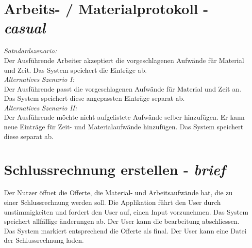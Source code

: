 \documentclass[journal]{combine}
\begin{document}
	\newpage
	\section{Arbeits- / Materialprotokoll  - \emph{casual}}
		\emph{Satndardszenario:} \\
		Der Ausführende Arbeiter akzeptiert die vorgeschlagenen Aufwände für Material
		und Zeit. Das System speichert die Einträge ab.\\
		\emph{Alternatives Szenario I:}\\
		Der Ausführende passt die vorgeschlagenen Aufwände für Material und Zeit an.
		Das System speichert diese angepassten Einträge separat ab.\\	
		\emph{Alternatives Szenario II:}\\
		Der Ausführende möchte nicht aufgelistete Aufwände selber hinzufügen. Er kann neue
		Einträge für Zeit- und Materialaufwände hinzufügen. Das System speichert diese separat ab.
	\newpage
	\section{Schlussrechnung erstellen - \emph{brief}}
		Der Nutzer öffnet die Offerte, die Material- und Arbeitsaufwände hat,
		die zu einer Schlussrechnung werden soll. Die Applikation führt den User durch
		unstimmigkeiten und fordert den User auf, einen Input vorzunehmen. Das System
		speichert allfällige änderungen ab. Der User kann die bearbeitung abschliessen.
		Das System markiert entsprechend die Offerte als final. Der User kann eine Datei der 
		Schlussrechnung laden.
\end{document}
